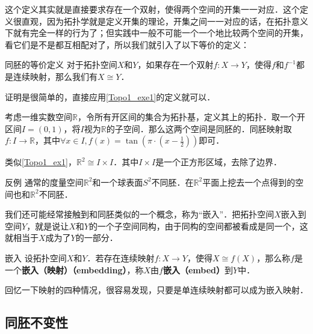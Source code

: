 这个定义其实就是直接要求存在一个双射，使得两个空间的开集一一对应．这个定义很直观，因为拓扑学就是定义开集的理论，开集之间一一对应的话，在拓扑意义下就有完全一样的行为了；但实践中一般不可能一个一个地比较两个空间的开集，看它们是不是都互相配对了，所以我们就引入了以下等价的定义：

\begin{theorem}{同胚的等价定义}\label{Topo1_the1}
对于拓扑空间$X$和$Y$，如果存在一个双射$f:X\rightarrow Y$，使得$f$和$f^{-1}$都是连续映射，那么我们有$X\cong Y$．
\end{theorem}

证明是很简单的，直接应用\autoref{Topo1_exe1}的定义就可以．

\begin{example}{}\label{Topo1_ex1}
考虑一维实数空间$\mathbb{R}$，令所有开区间的集合为拓扑基，定义其上的拓扑．取一个开区间$I=(0, 1)$，将$I$视为$\mathbb{R}$的子空间．那么这两个空间是同胚的．同胚映射取$f:I\rightarrow\mathbb{R}$，其中$\forall x\in I, f(x)=\tan{(\pi\cdot(x-\frac{1}{2}))}$即可．
\end{example}

\begin{example}{}\label{Topo1_ex2}
类似\autoref{Topo1_ex1}，$\mathbb{R}^2\cong I\times I$．其中$I\times I$是一个正方形区域，去除了边界．
\end{example}

\begin{example}{反例}\label{Topo1_ex3}
通常的度量空间$\mathbb{R}^2$和一个球表面$S^2$不同胚．在$\mathbb{R}^2$平面上挖去一个点得到的空间也和$\mathbb{R}^2$不同胚．
\end{example}

我们还可能经常接触到和同胚类似的一个概念，称为“嵌入”．把拓扑空间$X$嵌入到空间$Y$，就是说让$X$和$Y$的一个子空间同构，由于同构的空间都被看成是同一个，这就相当于$X$成为了$Y$的一部分．

\begin{definition}{嵌入}
设拓扑空间$X$和$Y$．若存在连续映射$f:X\rightarrow Y$，使得$X\cong f(X)$，那么称$f$是一个\textbf{嵌入（映射）（embedding）}，称$X$由$f$\textbf{嵌入（embed）}到$Y$中．
\end{definition}

回忆一下映射的四种情况，很容易发现，只要是单连续映射都可以成为嵌入映射．

\subsection{同胚不变性}

